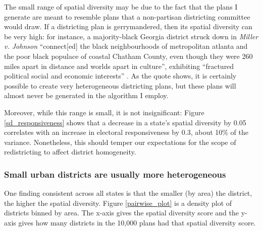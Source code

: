 \documentclass[]{article}
\begin{document}
The small range of spatial diversity may be due to the fact that the
plans I generate are meant to resemble plans that a non-partisan
districting committee would draw. If a districting plan is
gerrymandered, then its spatial diversity can be very high: for
instance, a majority-black Georgia district struck down in \emph{Miller
v. Johnson} ``connect{[}ed{]} the black neighbourhoods of metropolitan
atlanta and the poor black populace of coastal Chatham County, even
though they were 260 miles apart in distance and worlds apart in
culture'', exhibiting ``fractured political social and economic
interests'' \citep{steph2012}. As the quote shows, it is certainly
possible to create very heterogeneous districting plans, but these plans
will almost never be generated in the algorithm I employ.

Moreover, while this range is small, it is not insignificant: Figure
\ref{sd_responsiveness} shows that a decrease in a state's spatial
diversity by 0.05 correlates with an increase in electoral
responsiveness by 0.3, about 10\% of the variance. Nonetheless, this
should temper our expectations for the scope of redistricting to affect
district homogeneity.

\hypertarget{small-urban-districts-are-usually-more-heterogeneous}{%
\subsubsection{Small urban districts are usually more
heterogeneous}\label{small-urban-districts-are-usually-more-heterogeneous}}

One finding consistent across all states is that the smaller (by area)
the district, the higher the spatial diversity. Figure
\ref{pairwise_plot} is a density plot of districts binned by area. The
x-axis gives the spatial diversity score and the y-axis gives how many
districts in the 10,000 plans had that spatial diversity score.
\end{document}
